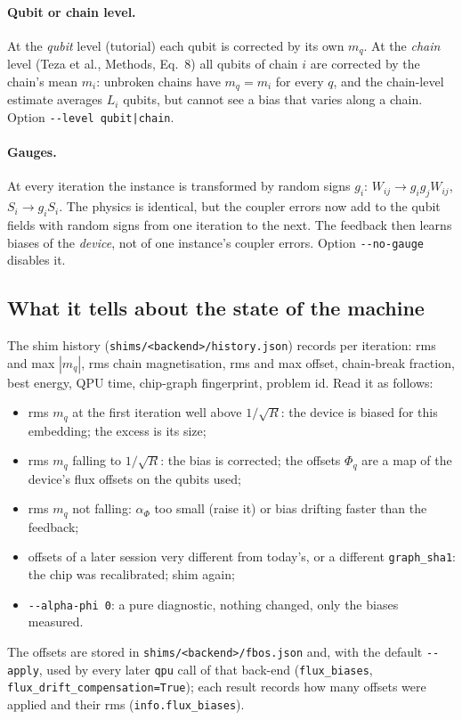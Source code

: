 \documentclass[11pt,a4paper]{article}
\newcommand{\code}[1]{\nolinkurl{#1}}
\begin{document}
\paragraph{Qubit or chain level.} At the \emph{qubit} level (tutorial) each qubit is corrected by its own $m_q$. At the \emph{chain} level (Teza et al., Methods, Eq.~8) all qubits of chain $i$ are corrected by the chain's mean $m_i$: unbroken chains have $m_q=m_i$ for every $q$, and the chain-level estimate averages $L_i$ qubits, but cannot see a bias that varies along a chain. Option \code{--level qubit|chain}.

\paragraph{Gauges.} At every iteration the instance is transformed by random signs $g_i$: $W_{ij}\to g_ig_jW_{ij}$, $S_i\to g_iS_i$. The physics is identical, but the coupler errors now add to the qubit fields with random signs from one iteration to the next. The feedback then learns biases of the \emph{device}, not of one instance's coupler errors. Option \code{--no-gauge} disables it.

\subsection{What it tells about the state of the machine}
The shim history (\code{shims/<backend>/history.json}) records per iteration: rms and max $|m_q|$, rms chain magnetisation, rms and max offset, chain-break fraction, best energy, QPU time, chip-graph fingerprint, problem id. Read it as follows:
\begin{itemize}
\item rms $m_q$ at the first iteration well above $1/\sqrt R$: the device is biased for this embedding; the excess is its size;
\item rms $m_q$ falling to $1/\sqrt R$: the bias is corrected; the offsets $\Phi_q$ are a map of the device's flux offsets on the qubits used;
\item rms $m_q$ not falling: $\alpha_\Phi$ too small (raise it) or bias drifting faster than the feedback;
\item offsets of a later session very different from today's, or a different \code{graph_sha1}: the chip was recalibrated; shim again;
\item \code{--alpha-phi 0}: a pure diagnostic, nothing changed, only the biases measured.
\end{itemize}
The offsets are stored in \code{shims/<backend>/fbos.json} and, with the default \code{--apply}, used by every later \code{qpu} call of that back-end (\code{flux_biases}, \code{flux_drift_compensation=True}); each result records how many offsets were applied and their rms (\code{info.flux_biases}).
\end{document}
